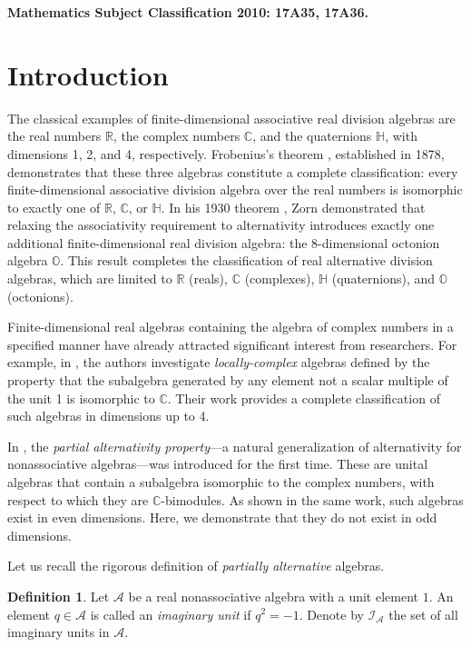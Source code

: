 \documentclass{amsart}
\theoremstyle{definition}
\newtheorem{definition}{Definition}
\theoremstyle{plain}
\begin{document}
{\small \bf Mathematics Subject Classification 2010: 17A35, 17A36.}

\section{Introduction}

The classical examples of finite-dimensional associative real division algebras are the real numbers $\mathbb{R}$, the complex numbers $\mathbb{C}$, and the quaternions $\mathbb{H}$, with dimensions 1, 2, and 4, respectively. Frobenius's theorem \cite{Frob}, established in 1878, demonstrates that these three algebras constitute a complete classification: every finite-dimensional associative division algebra over the real numbers is isomorphic to exactly one of $\mathbb{R}$, $\mathbb{C}$, or $\mathbb{H}.$ In his 1930 theorem \cite{Zorn}, Zorn demonstrated that relaxing the associativity requirement to alternativity introduces exactly one additional finite-dimensional real division algebra: the 8-dimensional octonion algebra $\mathbb O$. This result completes the classification of real alternative division algebras, which are limited to $\mathbb R$ (reals), $\mathbb C$ (complexes), $\mathbb H$ (quaternions), and $\mathbb O$ (octonions).

Finite-dimensional real algebras containing the algebra of complex numbers in a specified manner have already attracted significant interest from researchers. For example, in \cite{MPS}, the authors investigate \emph{locally-complex} algebras defined by the property that the subalgebra generated by any element not a scalar multiple of the unit 1 is isomorphic to $\mathbb C$.
Their work provides a complete classification of such algebras in dimensions up to 4. 

In \cite{HNT}, the \emph{partial alternativity property}—a natural generalization of alternativity for nonassociative algebras—was introduced for the first time. These are unital algebras that contain a subalgebra isomorphic to the complex numbers, with respect to which they are $\mathbb{C}$-bimodules. As shown in the same work, such algebras exist in even dimensions. Here, we demonstrate that they do not exist in odd dimensions.


Let us recall the rigorous definition of \emph{partially alternative} algebras.

\begin{definition} \label{ImaginaryUnits} 
Let $\mathcal{A}$ be a real nonassociative algebra with a unit element $1$. An element $q \in \mathcal{A}$ is called an \textit{imaginary unit}  if $q^2=-1$.
Denote by $\mathcal{I}_\mathcal{A}$  the set of all imaginary units in $\mathcal{A}$.
\end{definition}
\end{document}
